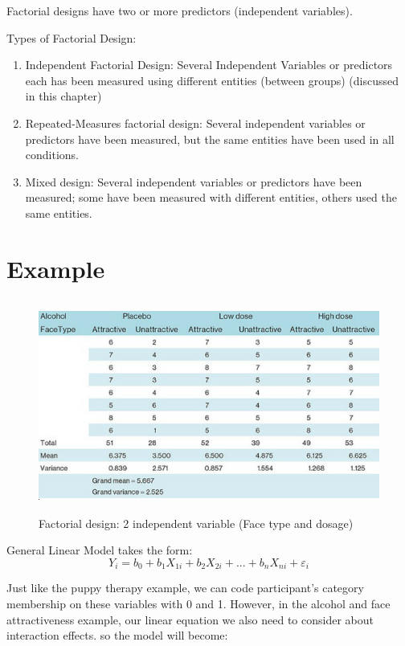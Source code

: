 Factorial designs have two or more predictors (independent variables).

Types of Factorial Design:
\begin{enumerate}
\item Independent Factorial Design: Several Independent Variables or predictors each has been measured using different entities (between groups) (discussed in this chapter)
\item Repeated-Measures factorial design: Several independent variables or predictors have been measured, but the same entities have been used in all conditions. 
\item Mixed design: Several independent variables or predictors have been measured; some have been measured with different entities, others used the same entities.
\end{enumerate}

\section{Example}
\begin{figure}[h]
	\includegraphics[width=1\textwidth,height=70mm]{Chapter 14 GLM 3 Factorial Designs/beergoggleeffect.PNG}
	\caption{Factorial design: 2 independent variable (Face type and dosage) }
\end{figure}


General Linear Model takes the form:
\begin{equation}
Y_i = b_0 + b_1X_{1i} + b_2X_{2i} + ...+ b_nX_{ni} + \varepsilon_i
\end{equation}

Just like the puppy therapy example, we can code participant's category membership on these variables with 0 and 1. 
However, in the alcohol and face attractiveness example, our linear equation we also need to consider about interaction effects. so the model will become:

